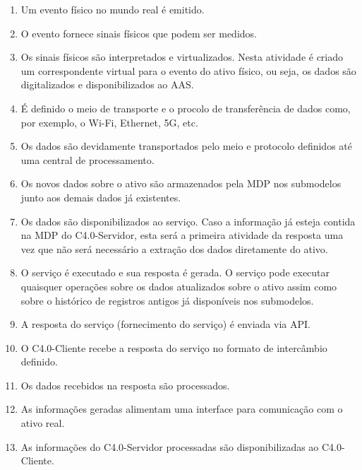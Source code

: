 \begin{enumerate}

	\item Um evento físico no mundo real é emitido.

	\item O evento fornece sinais físicos que podem ser medidos.

	\item Os sinais físicos são interpretados e virtualizados. Nesta atividade é criado um correspondente virtual para o evento do ativo físico, ou seja, os dados são digitalizados e disponibilizados ao AAS.

	\item É definido o meio de transporte e o procolo de transferência de dados como, por exemplo, o Wi-Fi, Ethernet, 5G, etc.

	\item Os dados são devidamente transportados pelo meio e protocolo definidos até uma central de processamento.

	\item Os novos dados sobre o ativo são armazenados pela MDP nos submodelos junto aos demais dados já existentes.

	\item Os dados são disponibilizados ao serviço. Caso a informação já esteja contida na MDP do C4.0-Servidor, esta será a primeira atividade da resposta uma vez que não será necessário a extração dos dados diretamente do ativo.

	\item O serviço é executado e sua resposta é gerada. O serviço pode executar quaisquer operações sobre os dados atualizados sobre o ativo assim como sobre o histórico de registros antigos já disponíveis nos submodelos.

	\item A resposta do serviço (fornecimento do serviço) é enviada via API.

	\item O C4.0-Cliente recebe a resposta do serviço no formato de intercâmbio definido.

	\item Os dados recebidos na resposta são processados.

	\item As informações geradas alimentam uma interface para comunicação com o ativo real.

	\item As informações do C4.0-Servidor processadas são disponibilizadas ao C4.0-Cliente.
\end{enumerate}
